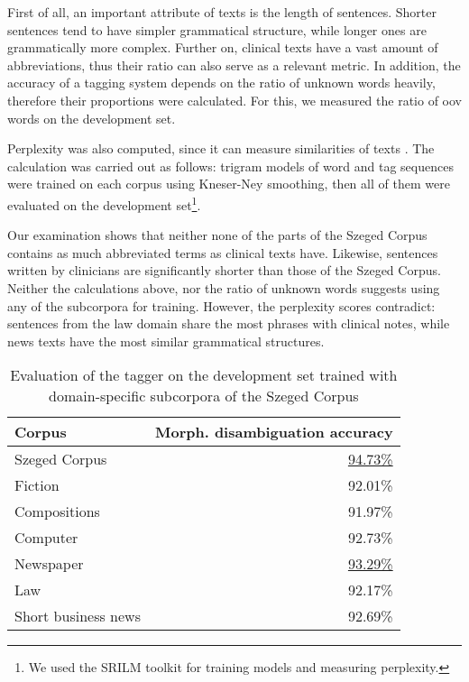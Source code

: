 First of all, an important attribute of texts is the length of sentences. 
Shorter sentences tend to have simpler grammatical structure, while longer ones are grammatically more complex. 
Further on, clinical texts have a vast amount of abbreviations, thus their ratio can also serve as a relevant metric. 
In addition, the accuracy of a tagging system depends on the ratio of unknown words heavily, therefore their proportions were calculated. 
For this, we measured the ratio of \acrshort{oov} words on the development set. 

Perplexity was also computed, since it can measure similarities of texts \cite{kilgarriff1998measures}. 
The calculation was carried out as follows: trigram models of word and tag sequences were trained on each corpus using Kneser-Ney smoothing, then all of them were evaluated on the development set\footnote{We used the SRILM toolkit \cite{stolcke2002srilm} for training models and measuring perplexity.}.

Our examination shows that neither none of the parts of the Szeged Corpus contains as much abbreviated terms as clinical texts have. 
Likewise, sentences written by clinicians are significantly shorter than those of the Szeged Corpus. 
Neither the calculations above, nor the ratio of unknown words suggests using any of the  subcorpora for training. 
However, the perplexity scores contradict: sentences from the law domain share the most phrases with clinical notes, while news texts have the most similar grammatical structures. 

\begin{table}[H]
\centering
\caption{Evaluation of the tagger on the development set trained with domain-specific subcorpora of the Szeged Corpus}
\label{tab:eval_subcorpora}
\begin{tabular}{ l r } 
\hline
Corpus & Morph. disambiguation accuracy \\
\hline
Szeged Corpus & \underline{94.73\%} \\
\hspace{0.2cm} Fiction & 92.01\% \\
\hspace{0.2cm} Compositions & 91.97\% \\
\hspace{0.2cm} Computer & 92.73\% \\
\hspace{0.2cm} Newspaper & \underline{93.29\%} \\
\hspace{0.2cm} Law & 92.17\% \\
\hspace{0.2cm} Short business news & 92.69\% \\
\hline
\end{tabular}
\end{table}


